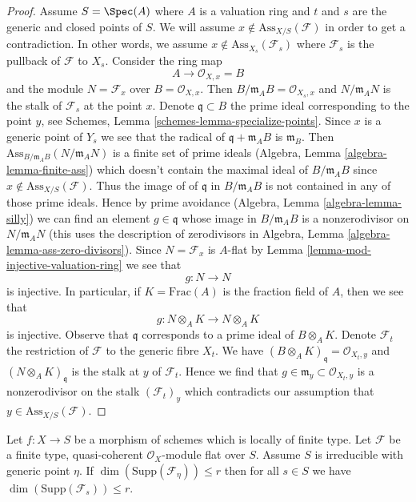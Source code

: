 \begin{proof}
\medskip\noindent
Assume $S = \Spec(A)$ where $A$ is a valuation ring
and $t$ and $s$ are the generic and closed points of $S$.
We will assume $x \not \in \text{Ass}_{X/S}(\mathcal{F})$
in order to get a contradiction. In other words, we assume
$x \not \in \text{Ass}_{X_s}(\mathcal{F}_s)$ where
$\mathcal{F}_s$ is the pullback of $\mathcal{F}$ to $X_s$.
Consider the ring map
$$
A \longrightarrow \mathcal{O}_{X, x} = B
$$
and the module $N = \mathcal{F}_x$ over $B = \mathcal{O}_{X, x}$.
Then $B/\mathfrak m_A B = \mathcal{O}_{X_s, x}$ and
$N/\mathfrak m_A N$ is the stalk of $\mathcal{F}_s$ at the point $x$.
Denote $\mathfrak q \subset B$ the prime ideal corresponding to the
point $y$, see Schemes, Lemma \ref{schemes-lemma-specialize-points}.
Since $x$ is a generic point of $Y_s$ we see that the radical of
$\mathfrak q + \mathfrak m_A B$ is $\mathfrak m_B$.
Then $\text{Ass}_{B/\mathfrak m_A B}(N/\mathfrak m_A N)$
is a finite set of prime ideals (Algebra, Lemma \ref{algebra-lemma-finite-ass})
which doesn't contain the maximal ideal of $B/\mathfrak m_A B$
since $x \not \in \text{Ass}_{X/S}(\mathcal{F})$.
Thus the image of of $\mathfrak q$ in $B/\mathfrak m_A B$ is not
contained in any of those prime ideals. Hence
by prime avoidance (Algebra, Lemma \ref{algebra-lemma-silly})
we can find an element $g \in \mathfrak q$
whose image in $B/\mathfrak m_A B$ is a nonzerodivisor on
$N/\mathfrak m_A N$ (this uses the description of zerodivisors
in Algebra, Lemma \ref{algebra-lemma-ass-zero-divisors}). Since
$N = \mathcal{F}_x$ is $A$-flat by
Lemma \ref{lemma-mod-injective-valuation-ring} we see that
$$
g : N \longrightarrow N
$$
is injective. In particular, if $K = \text{Frac}(A)$ is the
fraction field of $A$, then we see that
$$
g : N \otimes_A K \longrightarrow N \otimes_A K
$$
is injective. Observe that $\mathfrak q$ corresponds to a
prime ideal of $B \otimes_A K$. Denote $\mathcal{F}_t$ the
restriction of $\mathcal{F}$ to the generic fibre $X_t$. We have
$(B \otimes_A K)_{\mathfrak q} = \mathcal{O}_{X_t, y}$
and $(N \otimes_A K)_\mathfrak q$
is the stalk at $y$ of $\mathcal{F}_t$. Hence we find
that $g \in \mathfrak m_y \subset \mathcal{O}_{X_t, y}$
is a nonzerodivisor on the stalk $(\mathcal{F}_t)_y$
which contradicts our assumption that $y \in \text{Ass}_{X/S}(\mathcal{F})$.
\end{proof}

\begin{lemma}
\label{lemma-relative-dimension-support-flat}
Let $f : X \to S$ be a morphism of schemes which is locally of finite type.
Let $\mathcal{F}$ be a finite type, quasi-coherent $\mathcal{O}_X$-module
flat over $S$. Assume $S$ is irreducible with generic point $\eta$.
If $\dim(\text{Supp}(\mathcal{F}_\eta)) \leq r$ then for all $s \in S$
we have $\dim(\text{Supp}(\mathcal{F}_s)) \leq r$.
\end{lemma}

